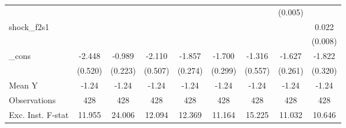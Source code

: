 {\begin{tabular}{l*{8}{c}}
            &                     &                     &                     &                     &                     &                     &     (0.005)         &                     \\
\addlinespace
shock\_f2s1  &                     &                     &                     &                     &                     &                     &                     &       0.022\sym{***}\\
            &                     &                     &                     &                     &                     &                     &                     &     (0.008)         \\
\addlinespace
\_cons      &      -2.448\sym{***}&      -0.989\sym{***}&      -2.110\sym{***}&      -1.857\sym{***}&      -1.700\sym{***}&      -1.316\sym{**} &      -1.627\sym{***}&      -1.822\sym{***}\\
            &     (0.520)         &     (0.223)         &     (0.507)         &     (0.274)         &     (0.299)         &     (0.557)         &     (0.261)         &     (0.320)         \\
\midrule
Mean Y      &       -1.24         &       -1.24         &       -1.24         &       -1.24         &       -1.24         &       -1.24         &       -1.24         &       -1.24         \\
Observations&         428         &         428         &         428         &         428         &         428         &         428         &         428         &         428         \\
Exc. Inst. F-stat&      11.955         &      24.006         &      12.094         &      12.369         &      11.164         &      15.225         &      11.032         &      10.646         \\
\bottomrule
\end{tabular}
}
